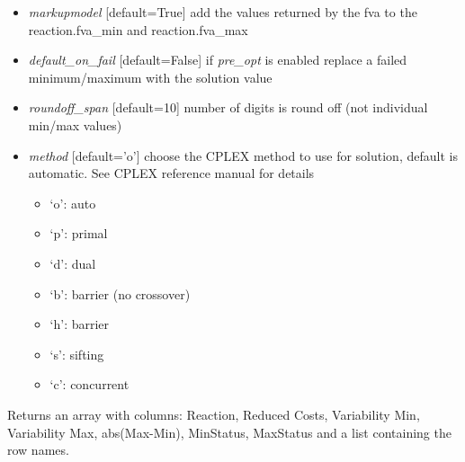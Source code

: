 \documentclass[a4paper,11pt,english]{sphinxmanual}
\begin{document}
\begin{fulllineitems}
\begin{itemize}
\item {} 
\emph{markupmodel} {[}default=True{]} add the values returned by the fva to the reaction.fva\_min and reaction.fva\_max

\item {} 
\emph{default\_on\_fail} {[}default=False{]} if \emph{pre\_opt} is enabled replace a failed minimum/maximum with the solution value

\item {} 
\emph{roundoff\_span} {[}default=10{]} number of digits is round off (not individual min/max values)

\item {} 
\emph{method} {[}default='o'{]} choose the CPLEX method to use for solution, default is automatic. See CPLEX reference manual for details
\begin{itemize}
\item {} 
`o': auto

\item {} 
`p': primal

\item {} 
`d': dual

\item {} 
`b': barrier (no crossover)

\item {} 
`h': barrier

\item {} 
`s': sifting

\item {} 
`c': concurrent

\end{itemize}

\end{itemize}

Returns an array with columns: Reaction, Reduced Costs, Variability Min, Variability Max, abs(Max-Min), MinStatus, MaxStatus and a list containing the row names.

\end{fulllineitems}

\end{document}
